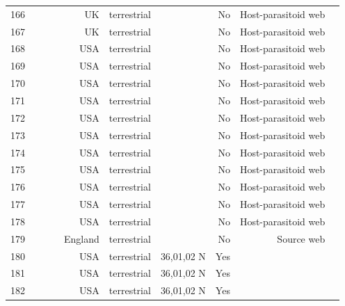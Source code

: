 \documentclass[12pt]{article}
\begin{document}
\begin{landscape}
\begin{table}[h!]
\begin{tabular}{rrrrrrrrr}
      166   & ~\citet{GlobalWeb} & ~\citet{Askew1961} & UK    & terrestrial &       & No    & Host-parasitoid web &  \\
      167   & ~\citet{GlobalWeb} & ~\citet{Askew1961} & UK    & terrestrial &       & No    & Host-parasitoid web &  \\
      168   & ~\citet{GlobalWeb} & ~\citet{Hawkins1984} & USA   & terrestrial &       & No    & Host-parasitoid web &  \\
      169   & ~\citet{GlobalWeb} & ~\citet{Hawkins1984} & USA   & terrestrial &       & No    & Host-parasitoid web &  \\
      170   & ~\citet{GlobalWeb} & ~\citet{Hawkins1984} & USA   & terrestrial &       & No    & Host-parasitoid web &  \\
      171   & ~\citet{GlobalWeb} & ~\citet{Hawkins1984} & USA   & terrestrial &       & No    & Host-parasitoid web &  \\
      172   & ~\citet{GlobalWeb} & ~\citet{Hawkins1984} & USA   & terrestrial &       & No    & Host-parasitoid web &  \\
      173   & ~\citet{GlobalWeb} & ~\citet{Hawkins1984} & USA   & terrestrial &       & No    & Host-parasitoid web &  \\
      174   & ~\citet{GlobalWeb} & ~\citet{Hawkins1984} & USA   & terrestrial &       & No    & Host-parasitoid web &  \\
      175   & ~\citet{GlobalWeb} & ~\citet{Hawkins1984} & USA   & terrestrial &       & No    & Host-parasitoid web &  \\
      176   & ~\citet{GlobalWeb} & ~\citet{Hawkins1984} & USA   & terrestrial &       & No    & Host-parasitoid web &  \\
      177   & ~\citet{GlobalWeb} & ~\citet{Hawkins1984} & USA   & terrestrial &       & No    & Host-parasitoid web &  \\
      178   & ~\citet{GlobalWeb} & ~\citet{Hawkins1984} & USA   & terrestrial &       & No    & Host-parasitoid web &  \\
      179   & ~\citet{GlobalWeb} & ~\citet{Robinson1953} & England & terrestrial &       & No    & Source web &  \\
      180   & ~\citet{GlobalWeb} & ~\citet{Savely1939} & USA   & terrestrial & 36,01,02 N & Yes   &       &  \\
      181   & ~\citet{GlobalWeb} & ~\citet{Savely1939} & USA   & terrestrial & 36,01,02 N & Yes   &       &  \\
      182   & ~\citet{GlobalWeb} & ~\citet{Savely1939} & USA   & terrestrial & 36,01,02 N & Yes   &       &  \\

\end{tabular}
\end{table}
\end{landscape}
\end{document}
